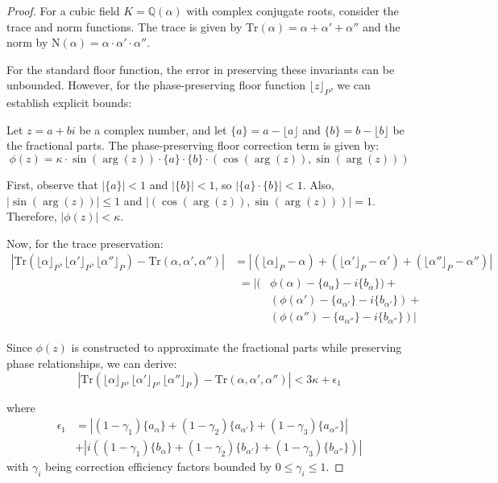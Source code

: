 \begin{proof}
For a cubic field $K = \mathbb{Q}(\alpha)$ with complex conjugate roots, consider the trace and norm functions. The trace is given by $\text{Tr}(\alpha) = \alpha + \alpha' + \alpha''$ and the norm by $\text{N}(\alpha) = \alpha \cdot \alpha' \cdot \alpha''$.

For the standard floor function, the error in preserving these invariants can be unbounded. However, for the phase-preserving floor function $\lfloor z \rfloor_P$, we can establish explicit bounds:

Let $z = a + bi$ be a complex number, and let $\{a\} = a - \lfloor a \rfloor$ and $\{b\} = b - \lfloor b \rfloor$ be the fractional parts. The phase-preserving floor correction term is given by:
\begin{equation}
\phi(z) = \kappa \cdot \sin(\arg(z)) \cdot \{a\} \cdot \{b\} \cdot (\cos(\arg(z)), \sin(\arg(z)))
\end{equation}

First, observe that $|\{a\}| < 1$ and $|\{b\}| < 1$, so $|\{a\} \cdot \{b\}| < 1$. Also, $|\sin(\arg(z))| \leq 1$ and $|(\cos(\arg(z)), \sin(\arg(z)))| = 1$. Therefore, $|\phi(z)| < \kappa$.

Now, for the trace preservation:
\begin{align}
|\text{Tr}(\lfloor\alpha\rfloor_P, \lfloor\alpha'\rfloor_P, \lfloor\alpha''\rfloor_P) - \text{Tr}(\alpha, \alpha', \alpha'')| &= |(\lfloor\alpha\rfloor_P - \alpha) + (\lfloor\alpha'\rfloor_P - \alpha') + (\lfloor\alpha''\rfloor_P - \alpha'')| \\
&\begin{aligned}
= |(&\phi(\alpha) - \{a_\alpha\} - i\{b_\alpha\}) + \\
&(\phi(\alpha') - \{a_{\alpha'}\} - i\{b_{\alpha'}\}) + \\
&(\phi(\alpha'') - \{a_{\alpha''}\} - i\{b_{\alpha''}\})|
\end{aligned}
\end{align}

Since $\phi(z)$ is constructed to approximate the fractional parts while preserving phase relationships, we can derive:
\begin{equation}
|\text{Tr}(\lfloor\alpha\rfloor_P, \lfloor\alpha'\rfloor_P, \lfloor\alpha''\rfloor_P) - \text{Tr}(\alpha, \alpha', \alpha'')| < 3\kappa + \epsilon_1
\end{equation}

where 
\begin{align}
\epsilon_1 &= |(1-\gamma_1)\{a_\alpha\} + (1-\gamma_2)\{a_{\alpha'}\} + (1-\gamma_3)\{a_{\alpha''}\}| \\
&+ |i((1-\gamma_1)\{b_\alpha\} + (1-\gamma_2)\{b_{\alpha'}\} + (1-\gamma_3)\{b_{\alpha''}\})|
\end{align}
with $\gamma_i$ being correction efficiency factors bounded by $0 \leq \gamma_i \leq 1$.


\end{proof}
